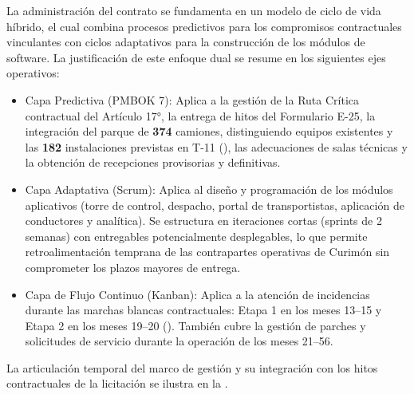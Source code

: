 La administración del contrato se fundamenta en un modelo de ciclo de vida híbrido, el cual combina procesos predictivos para los compromisos contractuales vinculantes con ciclos adaptativos para la construcción de los módulos de software. La justificación de este enfoque dual se resume en los siguientes ejes operativos:

\begin{itemize}
\item Capa Predictiva (PMBOK 7): Aplica a la gestión de la Ruta Crítica contractual del Artículo 17°, la entrega de hitos del Formulario E-25, la integración del parque de \textbf{374} camiones, distinguiendo equipos existentes y las \textbf{182} instalaciones previstas en T-11 (), las adecuaciones de salas técnicas y la obtención de recepciones provisorias y definitivas.
\item Capa Adaptativa (Scrum): Aplica al diseño y programación de los módulos aplicativos (torre de control, despacho, portal de transportistas, aplicación de conductores y analítica). Se estructura en iteraciones cortas (sprints de 2 semanas) con entregables potencialmente desplegables, lo que permite retroalimentación temprana de las contrapartes operativas de Curimón sin comprometer los plazos mayores de entrega.
\item Capa de Flujo Continuo (Kanban): Aplica a la atención de incidencias durante las marchas blancas contractuales: Etapa 1 en los meses 13–15 y Etapa 2 en los meses 19–20 (). También cubre la gestión de parches y solicitudes de servicio durante la operación de los meses 21–56.
\end{itemize}


La articulación temporal del marco de gestión y su integración con los hitos contractuales de la licitación se ilustra en la .



